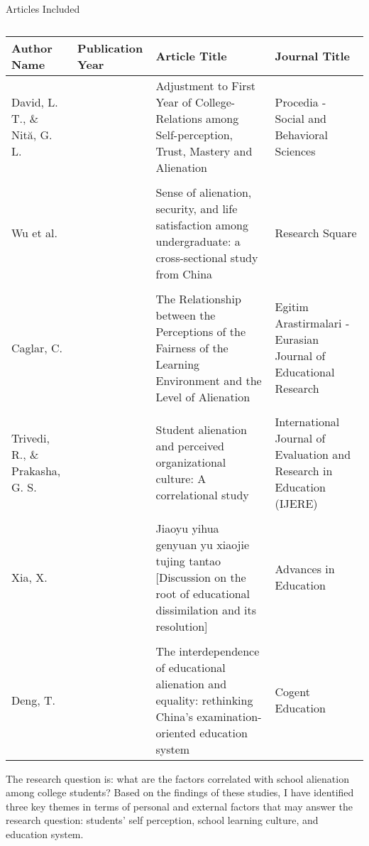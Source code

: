 \documentclass{scupi_apa_thesis}
\begin{document}
\begin{table}[h]
    \centering
    \caption{}
    \vspace{-15pt}
    \begin{flushleft}
        Articles Included
    \end{flushleft}
    \begin{tabularx}{\textwidth}{>{\hsize=0.7\hsize}X >{\hsize=0.5\hsize}X >{\hsize=1.8\hsize}X >{\hsize=1 \hsize}X}
        \toprule
        \textbf{Author Name} & \textbf{Publication Year} & \textbf{Article Title} & \textbf{Journal Title} \\
        \midrule
        David, L. T., \& Nită, G. L. & 2014 & Adjustment to First Year of College-Relations among Self-perception, Trust, Mastery and Alienation & Procedia - Social and Behavioral Sciences \\
        \\
        Wu et al. & 2024 & Sense of alienation, security, and life satisfaction among undergraduate: a cross-sectional study from China & Research Square \\
        \\
        Caglar, C. & 2013 & The Relationship between the Perceptions of the Fairness of the Learning Environment and the Level of Alienation & Egitim Arastirmalari - Eurasian Journal of Educational Research \\
        \\
        Trivedi, R., \& Prakasha, G. S. & 2021 & Student alienation and perceived organizational culture: A correlational study & International Journal of Evaluation and Research in Education (IJERE) \\
        \\
        Xia, X. & 2024 & Jiaoyu yihua genyuan yu xiaojie tujing tantao [Discussion on the root of educational dissimilation and its resolution] & Advances in Education \\
        \\
        Deng, T. & 2024 & The interdependence of educational alienation and equality: rethinking China's examination-oriented education system & Cogent Education \\
        \bottomrule
    \end{tabularx}
    \label{articles}
\end{table}

\par
The research question is: what are the factors correlated with school alienation among college students? 
Based on the findings of these studies, I have identified three key themes in terms of personal and external factors that may answer the research question: students’ self perception, school learning culture, and education system.
\end{document}
